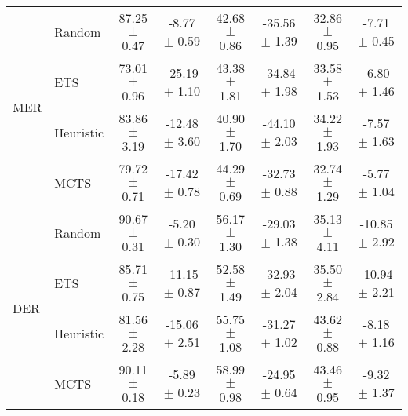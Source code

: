 \begin{tabular}{llcccccc}
	\multirow{4}{*}{MER}   & Random            & 87.25 $\pm$ 0.47  & -8.77 $\pm$ 0.59   & 42.68 $\pm$ 0.86  & -35.56 $\pm$ 1.39  & 32.86 $\pm$ 0.95    & -7.71 $\pm$ 0.45    \\
	& ETS               & 73.01 $\pm$ 0.96  & -25.19 $\pm$ 1.10  & 43.38 $\pm$ 1.81  & -34.84 $\pm$ 1.98  & 33.58 $\pm$ 1.53    & -6.80 $\pm$ 1.46    \\
	& Heuristic           & 83.86 $\pm$ 3.19  & -12.48 $\pm$ 3.60  & 40.90 $\pm$ 1.70  & -44.10 $\pm$ 2.03  & 34.22 $\pm$ 1.93    & -7.57 $\pm$ 1.63    \\
	& MCTS              & 79.72 $\pm$ 0.71  & -17.42 $\pm$ 0.78  & 44.29 $\pm$ 0.69  & -32.73 $\pm$ 0.88  & 32.74 $\pm$ 1.29    & -5.77 $\pm$ 1.04    \\ \midrule
	\multirow{4}{*}{DER}   & Random            & 90.67 $\pm$ 0.31  & -5.20 $\pm$ 0.30   & 56.17 $\pm$ 1.30  & -29.03 $\pm$ 1.38  & 35.13 $\pm$ 4.11    & -10.85 $\pm$ 2.92   \\
	& ETS               & 85.71 $\pm$ 0.75  & -11.15 $\pm$ 0.87  & 52.58 $\pm$ 1.49  & -32.93 $\pm$ 2.04  & 35.50 $\pm$ 2.84    & -10.94 $\pm$ 2.21   \\
	& Heuristic           & 81.56 $\pm$ 2.28  & -15.06 $\pm$ 2.51  & 55.75 $\pm$ 1.08  & -31.27 $\pm$ 1.02  & 43.62 $\pm$ 0.88    & -8.18 $\pm$ 1.16    \\
	& MCTS              & 90.11 $\pm$ 0.18  & -5.89 $\pm$ 0.23   & 58.99 $\pm$ 0.98  & -24.95 $\pm$ 0.64  & 43.46 $\pm$ 0.95    & -9.32 $\pm$ 1.37    \\ \midrule
\end{tabular}
